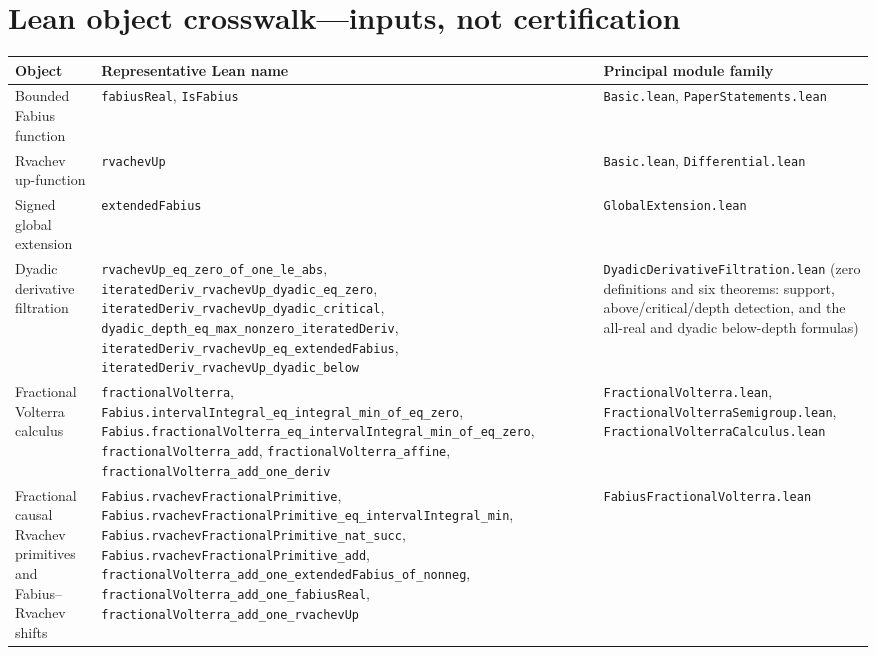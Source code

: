\documentclass[11pt,oneside]{article}
\theoremstyle{definition}
\theoremstyle{remark}
\begin{document}
\section*{Lean object crosswalk---inputs, not certification}
\begin{longtable}{@{}p{}p{}p{}@{}}
\toprule
Object & Representative Lean name & Principal module family \\
\midrule
\endhead
Bounded Fabius function & \nolinkurl{fabiusReal}, \nolinkurl{IsFabius} & \nolinkurl{Basic.lean}, \nolinkurl{PaperStatements.lean} \\
Rvachev up-function & \nolinkurl{rvachevUp} & \nolinkurl{Basic.lean}, \nolinkurl{Differential.lean} \\
Signed global extension & \nolinkurl{extendedFabius} & \nolinkurl{GlobalExtension.lean} \\
Dyadic derivative filtration &
\nolinkurl{rvachevUp_eq_zero_of_one_le_abs},
\nolinkurl{iteratedDeriv_rvachevUp_dyadic_eq_zero},
\nolinkurl{iteratedDeriv_rvachevUp_dyadic_critical},
\nolinkurl{dyadic_depth_eq_max_nonzero_iteratedDeriv},
\nolinkurl{iteratedDeriv_rvachevUp_eq_extendedFabius},
\nolinkurl{iteratedDeriv_rvachevUp_dyadic_below} &
\nolinkurl{DyadicDerivativeFiltration.lean} (zero definitions and six theorems:
support, above/critical/depth detection, and the all-real and dyadic
below-depth formulas) \\
Fractional Volterra calculus &
\nolinkurl{fractionalVolterra},
\nolinkurl{Fabius.intervalIntegral_eq_integral_min_of_eq_zero},
\nolinkurl{Fabius.fractionalVolterra_eq_intervalIntegral_min_of_eq_zero},
\nolinkurl{fractionalVolterra_add},
\nolinkurl{fractionalVolterra_affine}, \nolinkurl{fractionalVolterra_add_one_deriv} &
\nolinkurl{FractionalVolterra.lean}, \nolinkurl{FractionalVolterraSemigroup.lean},
\nolinkurl{FractionalVolterraCalculus.lean} \\
Fractional causal Rvachev primitives and Fabius--Rvachev shifts &
\nolinkurl{Fabius.rvachevFractionalPrimitive},
\nolinkurl{Fabius.rvachevFractionalPrimitive_eq_intervalIntegral_min},
\nolinkurl{Fabius.rvachevFractionalPrimitive_nat_succ},
\nolinkurl{Fabius.rvachevFractionalPrimitive_add},
\nolinkurl{fractionalVolterra_add_one_extendedFabius_of_nonneg},
\nolinkurl{fractionalVolterra_add_one_fabiusReal},
\nolinkurl{fractionalVolterra_add_one_rvachevUp} &
\nolinkurl{FabiusFractionalVolterra.lean} \\

\end{longtable}
\end{document}
